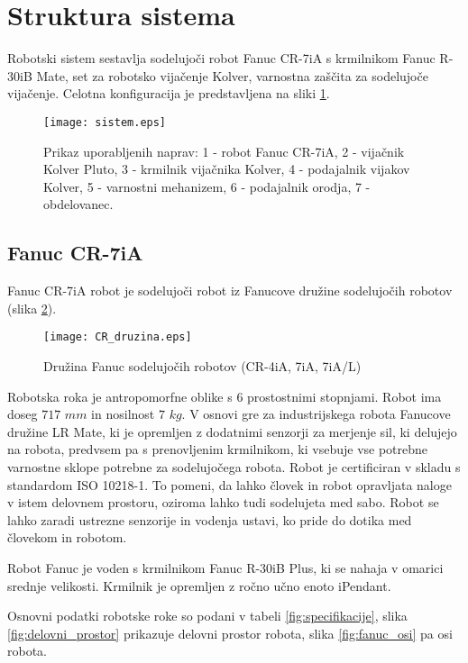 \section{Struktura sistema}

Robotski sistem sestavlja sodelujoči robot Fanuc CR-7iA s krmilnikom Fanuc R-30iB Mate, set za robotsko vijačenje Kolver, varnostna zaščita za sodelujoče vijačenje.  Celotna konfiguracija je predstavljena na sliki \ref{fig:fanuc_sistem}.

\begin{figure}[!hbt]
	\centering
	\texttt{[image: sistem.eps]}
	\caption{Prikaz uporabljenih naprav: 1 - robot Fanuc CR-7iA, 2 - vijačnik Kolver Pluto, 3 - krmilnik vijačnika Kolver, 4 - podajalnik vijakov Kolver, 5 - varnostni mehanizem, 6 - podajalnik orodja, 7 - obdelovanec.}
	\label{fig:fanuc_sistem}
\end{figure}

\subsection{Fanuc CR-7iA}

Fanuc CR-7iA robot je sodelujoči robot iz Fanucove družine sodelujočih robotov (slika \ref{fig:fanuc_druzina}). 

\begin{figure}[!hbt]
	\centering
	\texttt{[image: CR\_druzina.eps]}
	\caption{Družina Fanuc sodelujočih robotov (CR-4iA, 7iA, 7iA/L)}
	\label{fig:fanuc_druzina}
\end{figure}

Robotska roka je antropomorfne oblike s 6 prostostnimi stopnjami. Robot ima doseg $717$ $mm$ in nosilnost $7$ $kg$. V osnovi gre za industrijskega robota Fanucove družine LR Mate, ki je opremljen z dodatnimi senzorji za merjenje sil, ki delujejo na robota, predvsem pa s prenovljenim krmilnikom, ki vsebuje vse potrebne varnostne sklope potrebne za sodelujočega robota. Robot je certificiran v skladu s standardom ISO 10218-1. To pomeni, da lahko človek in robot opravljata naloge v istem delovnem prostoru, oziroma lahko tudi sodelujeta med sabo. Robot se lahko zaradi ustrezne senzorije in vodenja ustavi, ko pride do dotika med človekom in robotom. 

Robot Fanuc je voden s krmilnikom Fanuc R-30iB Plus, ki se nahaja v omarici srednje velikosti. Krmilnik je opremljen z ročno učno enoto iPendant. 

Osnovni podatki robotske roke so podani v tabeli \ref{fig:specifikacije}, slika \ref{fig:delovni_prostor} prikazuje delovni prostor robota, slika \ref{fig:fanuc_osi} pa osi robota.

